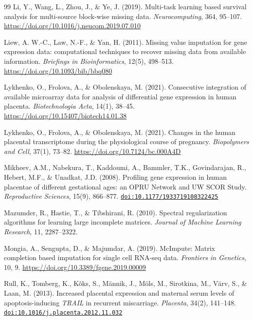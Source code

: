 \documentclass[11pt,a4paper]{article}
\newcommand{\doi}[1]{\href{https://doi.org/#1}{\texttt{doi:#1}}}
\begin{document}
\begin{thebibliography}{99}
Li, Y., Wang, L., Zhou, J., \& Ye, J. (2019). Multi-task
learning based survival analysis for multi-source block-wise
missing data. \emph{Neurocomputing}, 364, 95--107.
\url{https://doi.org/10.1016/j.neucom.2019.07.010}

Liew, A. W.-C., Law, N.-F., \& Yan, H. (2011). Missing value
imputation for gene expression data: computational techniques to
recover missing data from available information.
\emph{Briefings in Bioinformatics}, 12(5), 498--513.
\url{https://doi.org/10.1093/bib/bbq080}

Lykhenko, O., Frolova, A., \& Obolenskaya, M. (2021).
Consecutive integration of available microarray data for
analysis of differential gene expression in human placenta.
\emph{Biotechnologia Acta}, 14(1), 38--45.
\url{https://doi.org/10.15407/biotech14.01.38}

Lykhenko, O., Frolova, A., \& Obolenskaya, M. (2021). Changes
in the human placental transcriptome during the physiological
course of pregnancy. \emph{Biopolymers and Cell}, 37(1),
73--82. \url{https://doi.org/10.7124/bc.000A4D}

Mikheev, A.M., Nabekura, T., Kaddoumi, A., Bammler, T.K.,
Govindarajan, R., Hebert, M.F., \& Unadkat, J.D. (2008).
Profiling gene expression in human placentae of different
gestational ages: an OPRU Network and UW SCOR Study.
\emph{Reproductive Sciences}, 15(9), 866--877.
\doi{10.1177/1933719108322425}

Mazumder, R., Hastie, T., \& Tibshirani, R. (2010). Spectral
regularization algorithms for learning large incomplete matrices.
\emph{Journal of Machine Learning Research}, 11, 2287--2322.

Mongia, A., Sengupta, D., \& Majumdar, A. (2019). McImpute:
Matrix completion based imputation for single cell RNA-seq data.
\emph{Frontiers in Genetics}, 10, 9.
\url{https://doi.org/10.3389/fgene.2019.00009}

Rull, K., Tomberg, K., K\~{o}ks, S., M\"{a}nnik, J.,
M\"{o}ls, M., Sirotkina, M., V\"{a}rv, S., \& Laan, M. (2013).
Increased placental expression and maternal serum levels of
apoptosis-inducing \emph{TRAIL} in recurrent miscarriage.
\emph{Placenta}, 34(2), 141--148.
\doi{10.1016/j.placenta.2012.11.032}


\end{thebibliography}
\end{document}
